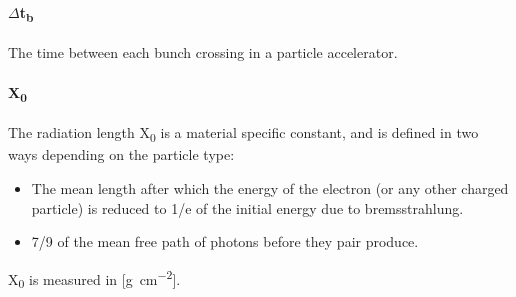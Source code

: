 \paragraph{$\Delta$t\textsubscript{b}}
The time between each bunch crossing in a particle accelerator.
\paragraph{X\textsubscript{0}}
The radiation length X\textsubscript{0} is a material specific constant, and is defined in two ways depending on the particle type:
\begin{itemize}
 \item The mean length after which the energy of the electron (or any other charged particle) is reduced to 1/e of the initial energy due to bremsstrahlung.
 \item 7/9 of the mean free path of photons before they pair produce.
\end{itemize}
X\textsubscript{0} is measured in [\si{\gram \per\centi\meter\squared}].
